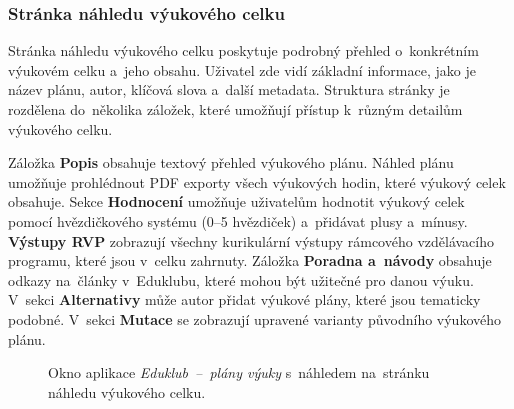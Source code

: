 \documentclass[male,czech,api_bc]{kitheses}
\begin{document}
\subsubsection{Stránka náhledu výukového celku}

Stránka náhledu výukového celku poskytuje podrobný přehled o~konkrétním výukovém celku a~jeho obsahu. Uživatel zde vidí základní informace, jako je název plánu, autor, klíčová slova a~další metadata. Struktura stránky je rozdělena do~několika záložek, které umožňují přístup k~různým detailům výukového celku.

Záložka \textbf{Popis} obsahuje textový přehled výukového plánu. Náhled plánu umožňuje prohlédnout PDF exporty všech výukových hodin, které výukový celek obsahuje. Sekce \textbf{Hodnocení} umožňuje uživatelům hodnotit výukový celek pomocí hvězdičkového systému (0--5 hvězdiček) a~přidávat plusy a~mínusy. \textbf{Výstupy RVP} zobrazují všechny kurikulární výstupy rámcového vzdělávacího programu, které jsou v~celku zahrnuty. Záložka \textbf{Poradna a~návody} obsahuje odkazy na~články v~Eduklubu, které mohou být užitečné pro danou výuku. V~sekci \textbf{Alternativy} může autor přidat výukové plány, které jsou tematicky podobné. V~sekci \textbf{Mutace} se zobrazují upravené varianty původního výukového plánu.

\begin{figure}[H]
	\centering
	\caption{Okno aplikace \textit{Eduklub~--~plány výuky} s~náhledem na~stránku náhledu výukového celku.}
	\label{fig:eduklub-4}
\end{figure}
\end{document}
